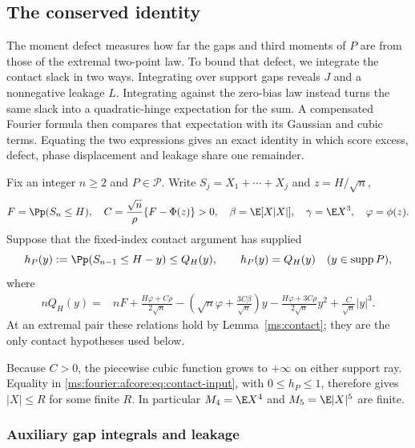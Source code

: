 \subsection{The conserved identity}
\label{ms:conserved}\label{ms:fourier:afcore:sec:conserved}

The moment defect measures how far the gaps and third moments of $P$ are
from those of the extremal two-point law. To bound that defect, we
integrate the contact slack in two ways. Integrating over support gaps
reveals $J$ and a nonnegative leakage $L$. Integrating against the
zero-bias law instead turns the same slack into a quadratic-hinge
expectation for the sum. A compensated Fourier formula then compares
that expectation with its Gaussian and cubic terms. Equating the two
expressions gives an exact identity in which score excess, defect,
phase displacement and leakage share one remainder.

Fix an integer $n\ge2$ and $P\in\mathcal P$.
Write $S_j=X_1+\cdots+X_j$ and $z=H/\sqrt n$,
\[
 F=\Pp(S_n\le H),\quad
 C=\frac{\sqrt n}{\rho}\{F-\Phi(z)\}>0,\quad
 \beta=\E[X|X|],\quad \gamma=\E X^3,\quad \varphi=\phi(z).
\]
Suppose that the fixed-index contact argument has supplied
\begin{equation}\label{ms:fourier:afcore:eq:contact-input}
 h_P(y):=\Pp(S_{n-1}\le H-y)\le Q_H(y),
 \qquad h_P(y)=Q_H(y)\quad(y\in\operatorname{supp}P),
\end{equation}
where
\begin{align}
 nQ_H(y)={}&nF+\frac{H\varphi+C\rho}{2\sqrt n}
 -\left(\sqrt n\varphi+\frac{3C\beta}{\sqrt n}\right)y
 -\frac{H\varphi+3C\rho}{2\sqrt n}y^2+\frac{C}{\sqrt n}|y|^3.
 \label{ms:fourier:afcore:eq:contact-polynomial}
\end{align}
At an extremal pair these relations hold by
Lemma~\ref{ms:contact}; they are the only contact hypotheses used below.

Because $C>0$, the piecewise cubic function grows to $+\infty$ on either support ray.
Equality in \eqref{ms:fourier:afcore:eq:contact-input}, with $0\le h_P\le1$,
therefore gives $|X|\le R$ for some finite $R$.
In particular $M_4=\E X^4$ and $M_5=\E|X|^5$ are finite.

\subsubsection{Auxiliary gap integrals and leakage}

